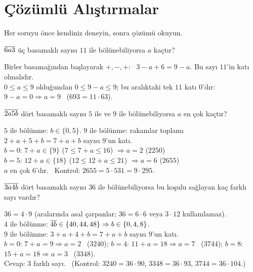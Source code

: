 \section{Çözümlü Alıştırmalar}
Her soruyu önce kendiniz deneyin, sonra çözümü okuyun.

\begin{alistirma}
\(\overline{6a3}\) üç basamaklı sayısı \(11\) ile bölünebiliyorsa \(a\) kaçtır?
\end{alistirma}
\begin{cozum}
Birler basamağından başlayarak \(+,-,+\): \ \(3-a+6=9-a\). Bu sayı \(11\)'in katı olmalıdır.\\
\(0\le a\le 9\) olduğundan \(0\le 9-a\le 9\); bu aralıktaki tek \(11\) katı \(0\)'dır: \(9-a=0\Rightarrow a=9\) \ (\(693=11\cdot 63\)).
\end{cozum}

\begin{alistirma}
\(\overline{2a5b}\) dört basamaklı sayısı \(5\) ile ve \(9\) ile bölünebiliyorsa \(a\) en çok kaçtır?
\end{alistirma}
\begin{cozum}
\(5\) ile bölünme: \(b\in\{0,5\}\). \quad \(9\) ile bölünme: rakamlar toplamı \(2+a+5+b=7+a+b\) sayısı \(9\)'un katı.\\
\(b=0\): \(7+a\in\{9\}\) (\(7\le 7+a\le 16\)) \(\Rightarrow a=2\) \quad (\(2250\))\\
\(b=5\): \(12+a\in\{18\}\) (\(12\le 12+a\le 21\)) \(\Rightarrow a=6\) \quad (\(2655\))\\
\(a\) en çok \(6\)'dır. \ Kontrol: \(2655=5\cdot 531=9\cdot 295\).
\end{cozum}

\begin{alistirma}
\(\overline{3a4b}\) dört basamaklı sayısı \(36\) ile bölünebiliyorsa bu koşulu sağlayan kaç farklı sayı vardır?
\end{alistirma}
\begin{cozum}
\(36=4\cdot 9\) (aralarında asal çarpanlar; \(36=6\cdot 6\) veya \(3\cdot 12\) kullanılamaz).\\
\(4\) ile bölünme: \(\overline{4b}\in\{40,44,48\}\Rightarrow b\in\{0,4,8\}\).\\
\(9\) ile bölünme: \(3+a+4+b=7+a+b\) sayısı \(9\)'un katı.\\
\(b=0\): \(7+a=9\Rightarrow a=2\) \ (\(3240\)); \quad \(b=4\): \(11+a=18\Rightarrow a=7\) \ (\(3744\)); \quad \(b=8\): \(15+a=18\Rightarrow a=3\) \ (\(3348\)).\\
Cevap: \(3\) farklı sayı. \ (Kontrol: \(3240=36\cdot 90\), \(3348=36\cdot 93\), \(3744=36\cdot 104\).)
\end{cozum}

